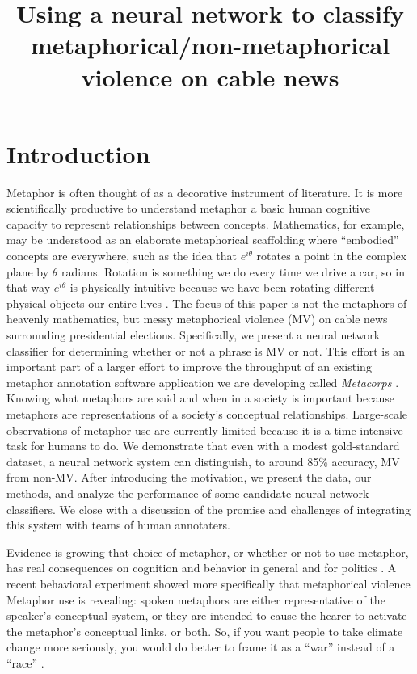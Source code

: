 \documentclass[11pt,letterpaper]{article}
\title{Using a neural network to classify metaphorical/non-metaphorical violence on
cable news}
\begin{document}
\maketitle


\section{Introduction}\label{introduction}

Metaphor is often thought of as a decorative instrument of literature.
It is more scientifically productive to understand metaphor a basic
human cognitive capacity to represent relationships between concepts.
Mathematics, for example, may be understood as an elaborate metaphorical
scaffolding where ``embodied'' concepts are everywhere, such as the idea
that \(e^{i\theta}\) rotates a point in the complex plane by \(\theta\)
radians. Rotation is something we do every time we drive a car, so in
that way \(e^{i\theta}\) is physically intuitive because we have been
rotating different physical objects our entire lives \cite{Nunez1999, Núñez2000}. 
The
focus of this paper is not the metaphors of heavenly mathematics, but
messy metaphorical violence (MV) on cable news surrounding presidential
elections. Specifically, we present a neural network classifier for
determining whether or not a phrase is MV or not. This effort is an
important part of a larger effort to improve the throughput of an
existing metaphor annotation software application we are developing
called \emph{Metacorps} \cite{Turner2016}. Knowing what metaphors are said and
when in a society is important because metaphors are representations of
a society's conceptual relationships. Large-scale observations of
metaphor use are currently limited because it is a time-intensive task
for humans to do. We demonstrate that even with a modest gold-standard
dataset, a neural network system can distinguish, to around 85\%
accuracy, MV from non-MV. After introducing the motivation, we present
the data, our methods, and analyze the performance of some candidate
neural network classifiers. We close with a discussion of the promise
and challenges of integrating this system with teams of human
annotaters.

Evidence is growing that choice of metaphor, or whether or not to use
metaphor, has real consequences on cognition and behavior in general
\cite{Lakoff2014} and for politics \cite{Matlock2012}. 
A recent behavioral experiment showed more specifically that 
metaphorical violence 
Metaphor use is revealing:
spoken metaphors are either representative of the speaker's conceptual
system, or they are intended to cause the hearer to activate the metaphor's
conceptual links, or both.
So, if you want people to take climate change more seriously, you would
do better to frame it as a ``war'' instead of a ``race'' \cite{Flusberg2017}.
\end{document}
